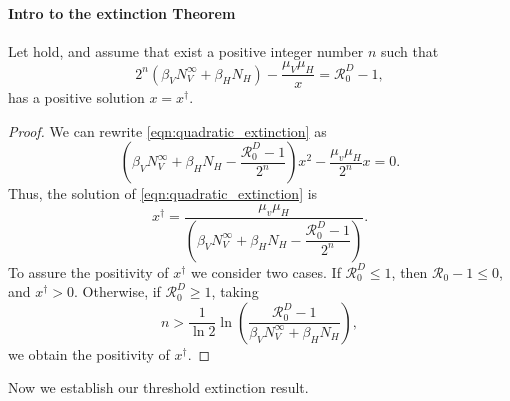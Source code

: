 %
\paragraph{Intro to the extinction Theorem}
\begin{lemma}
    \label{lem:quadratic_equation}
    Let  hold, 
    and assume that exist a positive integer number $n$
    such that 
    \begin{equation}\label{eqn:quadratic_extinction}
        2^n
        \left(
            \beta_V
             N_V^{\infty} +
            \beta_H N_H
        \right) 
        - \frac{\mu_V \mu_H}{x}
        =
        \mathcal{R}_0^D -1
        ,
    \end{equation}
    has a positive solution $x=x^\dagger$. 
\end{lemma}
%
\begin{proof}
    We can rewrite \eqref{eqn:quadratic_extinction} as
    \begin{equation*}
        \left(
             \beta_V
             N_V ^ {\infty} +
            \beta_H N_H
            -\frac{\mathcal{R}_0 ^ D - 1}{2 ^ n}
        \right) x ^ 2
        - \frac{\mu_v \mu_H}{2 ^ n} x
        = 0.
    \end{equation*}
    Thus, the solution of \eqref{eqn:quadratic_extinction} is
    \begin{equation}
        \label{eqn:quadratic_solution}
        x^{\dagger} = 
            \frac{\mu_v \mu_H}{
                \left(
                     \beta_V
                     N_V ^ {\infty} +
                    \beta_H N_H
                    -\dfrac{\mathcal{R}_0 ^ D - 1}{2 ^ n}
                \right)
            }.
    \end{equation}
    To assure the positivity of $x^{\dagger}$ we consider two cases.
    If $\mathcal{R}_0 ^ D \leq 1$, 
    then $\mathcal{R}_0 - 1 \leq 0$, and $x^{\dagger} >0$.
    Otherwise, if $\mathcal{R}_0 ^ D \geq 1$,
    taking 
    \begin{equation}
        \label{eqn:n_condition}
        n > \frac{1}{\ln 2} 
            \ln
            \left(
                \displaystyle
                \frac{\mathcal{R}_0 ^ D - 1}{
                    \beta_V
                    N_V ^ {\infty} +
                    \beta_H N_H
                }
            \right),
    \end{equation}
    we obtain the positivity of $x^{\dagger}$.
\end{proof}
%
%
%
Now we establish our threshold extinction result.
